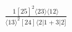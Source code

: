 \documentclass[varwidth, border=5pt]{standalone}
\begin{document}
\begin{my}
$\begin{gathered}
\scriptscriptstyle\frac{1[25]^2⟨23⟩⟨12⟩}{⟨13⟩^2[24]⟨2|1+3|2]}
\end{gathered}$
\end{my}
\end{document}
